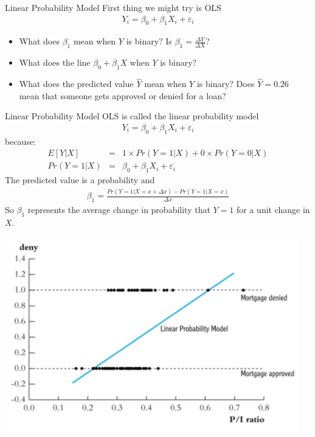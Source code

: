 \documentclass[aspectratio=169]{beamer}
\begin{document}
\begin{frame}{Linear Probability Model}
First thing we might try is OLS
\begin{eqnarray*}
Y_i  = \beta_0 + \beta_1 X_i + \varepsilon_i
\end{eqnarray*}
\begin{itemize}
\item What does $\beta_1$ mean when $Y$ is binary? Is $\beta_1  = \frac{\Delta Y}{\Delta X}$?
\item What does the line $\beta_0 + \beta_1 X$ when $Y$ is binary?
\item What does the predicted value $\hat{Y}$ mean when $Y$ is binary? Does $\hat{Y} = 0.26$ mean that someone gets approved or denied for a loan?
\end{itemize}
\end{frame}

\begin{frame}{Linear Probability Model}
OLS is called the \alert{linear probability model} 
\begin{eqnarray*}
Y_i  = \beta_0 + \beta_1 X_i + \varepsilon_i 
\end{eqnarray*}
because:
\begin{eqnarray*}
E[Y | X] &=& 1 \times Pr(Y=1 | X) + 0 \times Pr(Y=0  | X) \\
Pr(Y=1 | X) &=& \beta_0 + \beta_1 X_i + \varepsilon_i
\end{eqnarray*}
The predicted value is a \alert{probability} and 
\begin{eqnarray*}
\beta_1 = \frac{Pr(Y=1 | X =x+\Delta x) - Pr(Y=1 | X=x)}{\Delta x}
\end{eqnarray*}
So $\beta_1$ represents the average change in probability that $Y=1$ for a unit change in $X$.
\end{frame}


\begin{frame}
\begin{center}
\includegraphics[width=5in]{resources/lpm.pdf}\\
\end{center}
\end{frame}
\end{document}

